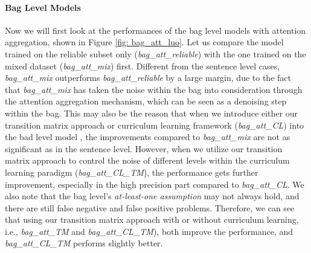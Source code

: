 \paragraph{Bag Level Models}
Now we will first look at the performances of the bag level models with attention aggregation, shown in Figure \ref{fig: bag_att_luo}. %
Let us compare the  model trained on the reliable subset only (\emph{bag\_att\_reliable}) with the one trained on the mixed dataset (\emph{bag\_att\_mix}) first. Different from the sentence level cases, \emph{bag\_att\_mix} outperforms \emph{bag\_att\_reliable} by a large margin, due to the fact that  \emph{bag\_att\_mix} has taken the noise within the bag into consideration through the attention aggregation mechanism, which can be seen as a denoising step within the bag. 
This may also be the reason that when we introduce either our transition matrix approach   or curriculum learning framework (\emph{bag\_att\_CL})   into the bad level model , the improvements compared to \emph{bag\_att\_mix}  are not as significant as in the sentence level. 
However, when we utilize our transition matrix approach to control the noise of different levels within the curriculum learning paradigm (\emph{bag\_att\_CL\_TM}), the performance gets further improvement, especially in the high precision part compared to \emph{bag\_att\_CL}.  
We also note that the bag level's  \textit{at-least-one assumption} may not always hold, and there are still false negative and false positive problems. Therefore, we can see that using our transition matrix approach with  or without curriculum learning, i.e.,  \emph{bag\_att\_TM}  and \emph{bag\_att\_CL\_TM}), both improve the performance, and \emph{bag\_att\_CL\_TM} performs slightly better.

